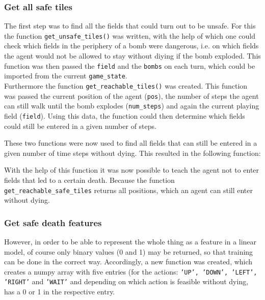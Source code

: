 \subsubsection*{Get all safe tiles}
The first step was to find all the fields that could turn out to be unsafe. For this the function \texttt{get\_unsafe\_tiles()} was written, with the help of which one could check which fields in the periphery of a bomb were dangerous, i.e. on which fields the agent would not be allowed to stay without diying if the bomb exploded. This function was then passed the \texttt{field} and the \texttt{bombs} on each turn, which could be imported from the current \texttt{game\_state}.
\\

Furthermore the function \texttt{get\_reachable\_tiles()} was created. This function was passed the current position of the agent (\texttt{pos}), the number of steps the agent can still walk until the bomb explodes (\texttt{num\_steps}) and again the current playing field (\texttt{field}). Using this data, the function could then determine which fields could still be entered in a given number of steps. \vspace{0.2cm}

These two functions were now used to find all fields that can still be entered in a given number of time steps without dying. This resulted in the following function:
\vspace{0.1cm}

\vspace{0.1cm}
With the help of this function it was now possible to teach the agent not to enter fields that led to a certain death. Because the function \texttt{get\_reachable\_safe\_tiles} returns all positions, which an agent can still enter without dying.


\subsubsection*{Get safe death features}
However, in order to be able to represent the whole thing as a feature in a linear model, of course only binary values (0 and 1) may be returned, so that training can be done in the correct way. Accordingly, a new function was created, which creates a numpy array with five entries (for the actions: \texttt{'UP', 'DOWN', 'LEFT', 'RIGHT'} and \texttt{'WAIT'} and depending on which action is feasible without dying, has a 0 or 1 in the respective entry.  
\\

